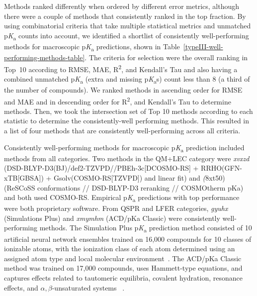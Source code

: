 \documentclass[9pt,lineno,final]{elife}
\newcommand{\pKa}{p\textit{K}\textsubscript{a}}
\begin{document}
Methods ranked differently when ordered by different error metrics, although there were a couple of methods that consistently ranked in the top fraction. 
By using combinatorial criteria that take multiple statistical metrics and unmatched \pKa{} counts into account, we identified a shortlist of consistently well-performing methods for macroscopic \pKa{} predictions, shown in Table~\ref{typeIII-well-performing-methods-table}. 
The criteria for selection were the overall ranking in Top~10 according to RMSE, MAE, R\textsuperscript{2}, and Kendall's Tau and also having a combined unmatched \pKa{} (extra and missing \pKa{}s) count less than 8 (a third of the number of compounds). We ranked methods in ascending order for RMSE and MAE and in descending order for R\textsuperscript{2}, and Kendall's Tau to determine methods. 
Then, we took the intersection set of Top 10 methods according to each statistic to determine the consistently-well performing methods.
This resulted in a list of four methods that are consistently well-performing across all criteria.

Consistently well-performing methods for macroscopic \pKa{} prediction included methods from all categories. 
Two methods in the QM+LEC category were \textit{xvxzd} (DSD-BLYP-D3(BJ)/def2-TZVPD//PBEh-3c[DCOSMO-RS] + RRHO(GFN-xTB[GBSA]) + Gsolv(COSMO-RS[TZVPD]) and linear fit) and \textit(8xt50) (ReSCoSS conformations // DSD-BLYP-D3 reranking // COSMOtherm pKa) and both used COSMO-RS. 
Empirical \pKa{} predictions with top performance were both proprietary software. 
From QSPR and LFER categories, \textit{gyuhx} (Simulations Plus) and \textit{xmymhm} (ACD/pKa Classic) were consistently well-performing methods. 
The Simulation Plus \pKa{} prediction method consisted of 10 artificial neural network ensembles trained on 16,000 compounds for 10 classes of ionizable atoms, with the ionization class of each atom determined using an assigned atom type and local molecular environment~\citep{simulation_plus_D3R_presentation}. 
The ACD/pKa Classic method was trained on 17,000 compounds, uses Hammett-type equations, and captures effects related to tautomeric equilibria, covalent hydration, resonance effects, and  $\alpha, \beta$-unsaturated systems ~\citep{ACD-pKa-classic}.
\end{document}
